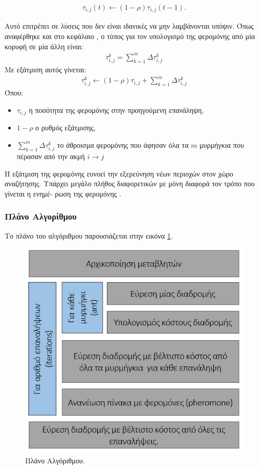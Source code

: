 \begin{align}
	τ_{i,j}(t)\leftarrow(1-ρ)τ_{i,j}(t-1).
\end{align}

Αυτό επιτρέπει σε λύσεις που δεν είναι ιδανικές να μην λαμβάνονται υπόψιν. Όπως αναφέρθηκε και στο κεφάλαιο , ο τύπος για τον υπολογισμό της φερομόνης από μία κορυφή σε μία άλλη είναι: 
\begin{align}
    τ_{i,j}^k=\sum_{k=1}^{m}{Δτ^k_{i,j}}
\end{align}
Με εξάτμιση αυτός γίνεται: 
\begin{align}
    τ_{i,j}^k\leftarrow(1-ρ)τ_{i,j}+\sum_{k=1}^{m}{Δτ^k_{i,j}}
\end{align}
Όπου: 
\begin{itemize}
    \item $τ_{i,j}$ η ποσότητα της φερομόνης στην προηγούμενη επανάληψη,
    \item $1-ρ$ ο ρυθμός εξάτμισης,
    \item $\sum_{k=1}^{m}{Δτ^k_{i,j}}$ το άθροισμα φερομόνης που άφησαν όλα τα $m$ μυρμήγκια που πέρασαν από την ακμή $i\rightarrow j$
\end{itemize}
Η εξάτμιση της φερομόνης ευνοεί την εξερεύνηση νέων περιοχών στον χώρο αναζήτησης. Υπάρχει μεγάλο πλήθος διαφορετικών  με μόνη διαφορά τον τρόπο που γίνεται η ενημέ- ρωση της φερομόνης \cite{mpikou2013euretikoi}.

\subsubsection{Πλάνο Αλγορίθμου}
Το πλάνο του αλγόριθμου παρουσιάζεται στην εικόνα \ref{plan}.
\begin{figure}
    \centering
    \includegraphics[scale=0.80]{2947_thesis/pictures/plan.png} 
    \caption{Πλάνο Αλγόριθμου.}
    \label{plan}
\end{figure}

